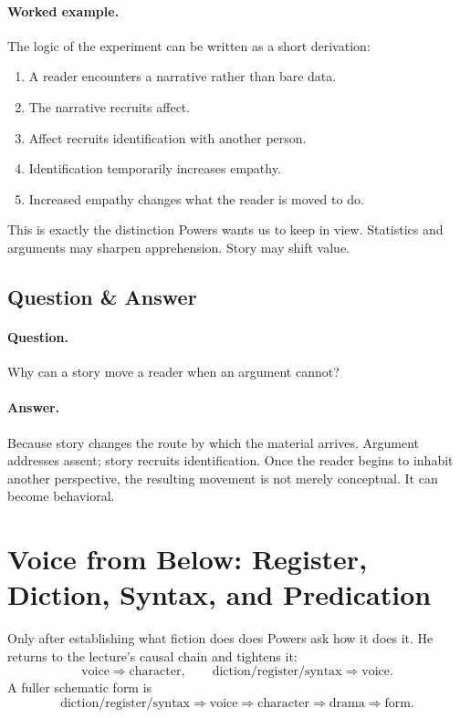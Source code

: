 \paragraph{Worked example.} The logic of the experiment can be written as a short derivation:
\begin{enumerate}
\item A reader encounters a narrative rather than bare data.
\item The narrative recruits affect.
\item Affect recruits identification with another person.
\item Identification temporarily increases empathy.
\item Increased empathy changes what the reader is moved to do.
\end{enumerate}
This is exactly the distinction Powers wants us to keep in view. Statistics and arguments may sharpen apprehension. Story may shift value.

\subsection{Question \& Answer}

\paragraph{Question.} Why can a story move a reader when an argument cannot?

\paragraph{Answer.} Because story changes the route by which the material arrives. Argument addresses assent; story recruits identification. Once the reader begins to inhabit another perspective, the resulting movement is not merely conceptual. It can become behavioral.

\section{Voice from Below: Register, Diction, Syntax, and Predication}

Only after establishing what fiction does does Powers ask how it does it. He returns to the lecture's causal chain and tightens it:
\begin{equation}
\text{voice} \Rightarrow \text{character}, \qquad
\text{diction/register/syntax} \Rightarrow \text{voice}.
\end{equation}
A fuller schematic form is
\begin{equation}
\text{diction/register/syntax} \Rightarrow \text{voice} \Rightarrow \text{character} \Rightarrow \text{drama} \Rightarrow \text{form}.
\end{equation}

